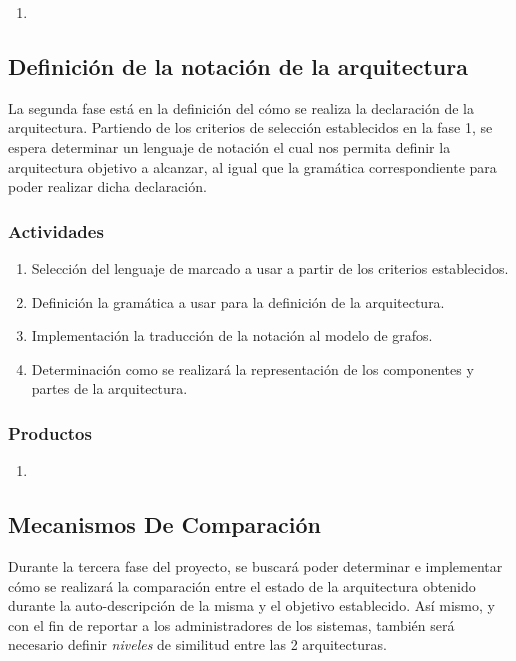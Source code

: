 \begin{enumerate}
    \itemsep-2mm
    \item 
\end{enumerate}

\subsection{Definición de la notación de la arquitectura}

La segunda fase está en la definición del cómo se realiza la declaración de la arquitectura. Partiendo de los criterios de selección establecidos en la fase 1, se espera determinar un lenguaje de notación el cual nos permita definir la arquitectura objetivo a alcanzar, al igual que la gramática correspondiente para poder realizar dicha declaración. 

\subsubsection*{Actividades}

\begin{enumerate}
    \itemsep-2mm
    \item Selección del lenguaje de marcado a usar a partir de los criterios establecidos.
    \item Definición la gramática a usar para la definición de la arquitectura.
    \item Implementación la traducción de la notación al modelo de grafos. %
    \item Determinación como se realizará la representación de los componentes y partes de la arquitectura.
\end{enumerate}    

\subsubsection*{Productos}

\begin{enumerate}
    \itemsep-2mm
    \item 
\end{enumerate}

\subsection{Mecanismos De Comparación}

Durante la tercera fase del proyecto, se buscará poder determinar e implementar cómo se realizará la comparación entre el estado de la arquitectura obtenido durante la auto-descripción de la misma y el objetivo establecido. Así mismo, y con el fin de reportar a los administradores de los sistemas, también será necesario definir \textit{niveles} de similitud entre las 2 arquitecturas.

